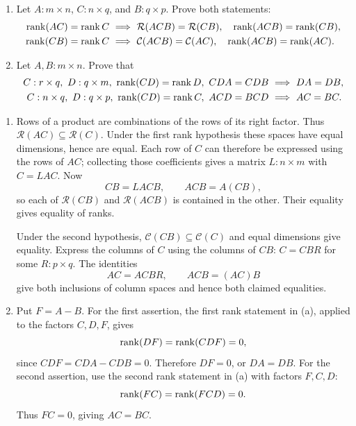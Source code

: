 \begin{problem}\label{ex:04:cancellation}
\begin{enumerate}
\item Let \(A:m\times n\), \(C:n\times q\), and \(B:q\times p\).
Prove both statements:
\[
\begin{split}
\operatorname{rank}(AC)=\operatorname{rank} C&\ \Longrightarrow\
\mathcal R(ACB)=\mathcal R(CB),\quad \operatorname{rank}(ACB)=\operatorname{rank}(CB),\\
\operatorname{rank}(CB)=\operatorname{rank} C&\ \Longrightarrow\
\mathcal C(ACB)=\mathcal C(AC),\quad \operatorname{rank}(ACB)=\operatorname{rank}(AC).
\end{split}
\]
\item Let \(A,B:m\times n\).
Prove that
\[
\begin{split}
C:r\times q,\ D:q\times m,\ \operatorname{rank}(CD)=\operatorname{rank} D,\ CDA=CDB
&\ \Longrightarrow\ DA=DB,\\
C:n\times q,\ D:q\times p,\ \operatorname{rank}(CD)=\operatorname{rank} C,\ ACD=BCD
&\ \Longrightarrow\ AC=BC.
\end{split}
\]
\end{enumerate}
\end{problem}
\begin{solution}
\begin{enumerate}
\item Rows of a product are combinations of the rows of its right factor.
Thus \(\mathcal R(AC)\subseteq\mathcal R(C)\).
Under the first rank hypothesis these spaces have equal dimensions, hence are equal.
Each row of \(C\) can therefore be expressed using the rows of \(AC\);
collecting those coefficients gives a matrix \(L:n\times m\) with \(C=LAC\).
Now
\[
CB=LACB,\qquad ACB=A(CB),
\]
so each of \(\mathcal R(CB)\) and \(\mathcal R(ACB)\) is contained in the other.
Their equality gives equality of ranks.

Under the second hypothesis, \(\mathcal C(CB)\subseteq\mathcal C(C)\)
and equal dimensions give equality.
Express the columns of \(C\) using the columns of \(CB\):
\(C=CBR\) for some \(R:p\times q\).
The identities
\[
AC=ACBR,\qquad ACB=(AC)B
\]
give both inclusions of column spaces and hence both claimed equalities.
\item Put \(F=A-B\).
For the first assertion, the first rank statement in (a), applied
to the factors \(C,D,F\), gives
\[
\operatorname{rank}(DF)=\operatorname{rank}(CDF)=0,
\]
since \(CDF=CDA-CDB=0\). Therefore \(DF=0\), or \(DA=DB\).
For the second assertion, use the second rank statement in (a)
with factors \(F,C,D\):
\[
\operatorname{rank}(FC)=\operatorname{rank}(FCD)=0.
\]
Thus \(FC=0\), giving \(AC=BC\).
\end{enumerate}
\end{solution}

